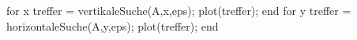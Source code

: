 
for x
  treffer = vertikaleSuche(A,x,eps);
  plot(treffer);  
end
for y
  treffer = horizontaleSuche(A,y,eps);
  plot(treffer);  
end
